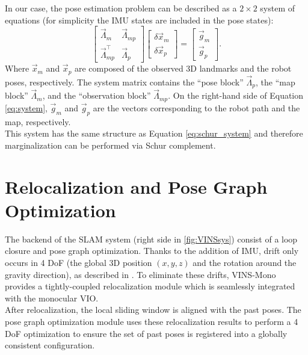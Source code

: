 In our case, the pose estimation problem can be described as a $2 \!\times \!2$ 
system of equations (for simplicity the \ac{IMU} states are included in the 
pose states):
\begin{equation}\label{eq:system}
  \begin{bmatrix}
    \vec{\Lambda}_m & \vec{\Lambda}_{mp} \\
    \vec{\Lambda}_{mp}^\top & \vec{\Lambda}_p
  \end{bmatrix} 
  \begin{bmatrix}
    \delta \vec{x}_m \\
    \delta \vec{x}_p
  \end{bmatrix} = 
  \begin{bmatrix}
    \vec{g}_m \\
    \vec{g}_p
  \end{bmatrix}.
\end{equation}
Where $\vec{x}_m$ and  $\vec{x}_p$ are composed of the observed 3D 
landmarks and the robot poses, respectively. The system matrix contains 
the ``pose block'' $\vec{\Lambda}_p$, the ``map block'' 
$\vec{\Lambda}_m$, and the ``observation block'' $\vec{\Lambda}_{mp}$. 
On the right-hand side of Equation \eqref{eq:system}, $\vec{g}_m$ and 
$\vec{g}_p$ are the vectors corresponding to the robot path and the map, 
respectively. \\

This system has the same structure as Equation \eqref{eq:schur_system} and 
therefore marginalization can be performed via Schur complement.


\section{Relocalization and Pose Graph Optimization}
The backend of the \ac{SLAM} system (right side in \autoref{fig:VINSsys})
consist of a loop closure and pose graph optimization. Thanks to the addition 
of \ac{IMU}, drift only occurs in 4 \ac{DoF} (the global 3D position $(x,y,z)$ 
and the rotation around the gravity direction), as described in 
\citep{Qin2017VINS}. To eliminate these drifts, VINS-Mono provides a 
tightly-coupled relocalization module which is seamlessly integrated with the 
monocular \ac{VIO}. \\

After relocalization, the local sliding window is aligned with the past poses. 
The pose graph optimization module uses these relocalization results 
to perform a 4 \ac{DoF} optimization to ensure the set of past poses is 
registered into a globally consistent configuration.
\\

